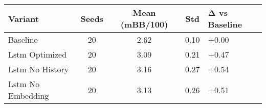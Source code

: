 \begin{tabular}{lcccl}
\toprule
Variant & Seeds & Mean (mBB/100) & Std & Δ vs Baseline \\
\midrule
Baseline & 20 & 2.62 & 0.10 & +0.00 \\
Lstm Optimized & 20 & 3.09 & 0.21 & +0.47 \\
Lstm No History & 20 & 3.16 & 0.27 & +0.54 \\
Lstm No Embedding & 20 & 3.13 & 0.26 & +0.51 \\
\bottomrule
\end{tabular}
